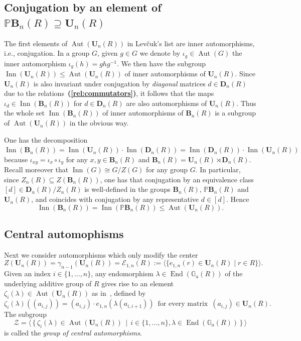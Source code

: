 \documentclass[a4paper,11pt]{amsart}
\numberwithin{equation}{section}
\theoremstyle{plain}
\theoremstyle{definition}
\newenvironment{rmk}
  {\pushQED{\qed}\renewcommand{\qedsymbol}{$\triangle$}\rmkx}
  {\popQED\endrmkx}
\newcommand{\ekl}[1]{e_{#1}} %
\newcommand{\mbU}{\mathbf{U}} %
\newcommand{\mbD}{\mathbf{D}} %
\newcommand{\Addi}{\mathbb{G}_{a}} %
\newcommand{\mbB}{\mathbf{B}} %
\newcommand{\PB}{\mathbb{P}\mathbf{B}} %
\newcommand{\gera}[1]{\langle {#1} \rangle}
\newcommand{\set}[1]{\{ #1 \}}
\newcommand{\mc}{\mathcal}
\newcommand{\bref}[1]{{\bf(\ref{#1})}} %
\DeclareMathOperator{\End}{End}
\DeclareMathOperator{\Aut}{Aut}
\DeclareMathOperator{\Inn}{Inn}
\begin{document}
\subsection{Conjugation by an element of $\PB_n(R) \supseteq \mbU_n(R)$}\label{Levchuk:inner}
The first elements of $\Aut(\mbU_n(R))$ in Lev\v{c}uk's list are inner automorphisms, i.e., conjugation. In a group $G$, given $g\in G$ we denote by $\iota_g \in \Aut(G)$ the inner automorphism $\iota_g(h) = ghg^{-1}$. We then have the subgroup $\Inn(\mbU_n(R)) \leq \Aut(\mbU_n(R))$ of inner automorphisms of $\mbU_n(R)$. Since $\mbU_n(R)$ is also invariant under conjugation by \emph{diagonal} matrices $d \in \mbD_n(R)$ due to the relations~\bref{rel:commutators},
it follows that the maps $\iota_d \in \Inn(\mbB_n(R))$ for $d \in \mbD_n(R)$ are also automorphisms of $\mbU_n(R)$. Thus the whole set $\Inn(\mbB_n(R))$ of inner automorphisms of $\mbB_n(R)$ is a subgroup of $\Aut(\mbU_n(R))$ in the obvious way. 

\begin{rmk} \label{obs:innerautomorphisms}
One has the decomposition $\Inn(\mbB_n(R)) = \Inn(\mbU_n(R)) \cdot \Inn(\mbD_n(R)) = \Inn(\mbD_n(R)) \cdot \Inn(\mbU_n(R))$ because $\iota_{xy} = \iota_x \circ \iota_y$ for any $x,y \in \mbB_n(R)$ and $\mbB_n(R) = \mbU_n(R) \rtimes \mbD_n(R)$. Recall moreover that $\Inn(G) \cong G/Z(G)$ for any group $G$. In particular, since $Z_n(R) \subseteq Z(\mbB_n(R))$, one has that conjugation by an equivalence class $[d] \in \mbD_n(R)/Z_n(R)$ is well-defined in the groups $\mbB_n(R)$, $\PB_n(R)$ and $\mbU_n(R)$, and coincides with conjugation by any representative $d \in [d]$. Hence 
\[\Inn(\mbB_n(R)) = \Inn(\PB_n(R)) \leq \Aut(\mbU_n(R)).\]
\end{rmk}

\subsection{Central automophisms} \label{Levchuk:central}
Next we consider automorphisms which only modify the center 
\[Z(\mbU_n(R)) = \gamma_{n-1}(\mbU_n(R)) = \mc{E}_{1,n}(R):=\langle \{ \ekl{1,n}(r) \in \mbU_n(R) \mid r \in R \}\rangle.\] 
Given an index $i \in \set{1,\ldots,n}$, any endomorphism $\lambda \in \End(\Addi(R))$ of the underlying additive group of $R$ gives rise to an element $\zeta_i(\lambda) \in \Aut(\mbU_n(R))$ as in~\cite[65]{LevchukOriginal}, defined by
\[ \zeta_i(\lambda)((a_{i,j})) = (a_{i,j}) \cdot \ekl{1,n}(\lambda(a_{i,i+1})) \, \text{ for every matrix } \, (a_{i,j}) \in \mbU_n(R). \]
The subgroup
\[ \mc{Z} = \gera{ \, \set{ \, \zeta_i(\lambda) \in \Aut(\mbU_n(R)) \, \mid \, i \in \set{1,\ldots,n}, \lambda \in \End(\Addi(R)) \, } \, } \]
is called the \emph{group of central automorphisms}.
\end{document}
